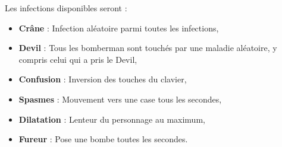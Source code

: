 Les infections disponibles seront :
\begin{itemize}
\item \textbf{Crâne} : Infection aléatoire parmi toutes les infections,
\item \textbf{Devil} : Tous les bomberman sont touchés par une maladie aléatoire, y compris celui qui a pris le Devil,
\item \textbf{Confusion} : Inversion des touches du clavier,
\item \textbf{Spasmes} : Mouvement vers une case tous les \nbSecondes secondes,
\item \textbf{Dilatation} : Lenteur du personnage au maximum,
\item \textbf{Fureur} : Pose une bombe toutes les \nbSecondes secondes.
\end{itemize}